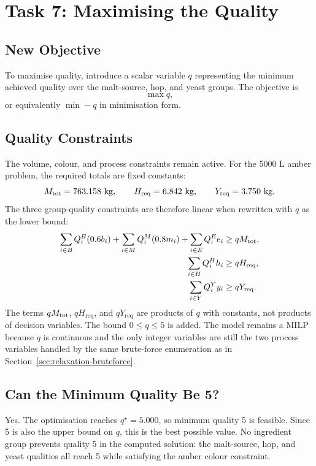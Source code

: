 \section{Task 7: Maximising the Quality}
\label{sec:task7}

\subsection{New Objective}
\label{sec:task7-objective}
To maximise quality, introduce a scalar variable $q$ representing the minimum achieved quality over the malt-source, hop, and yeast groups. The objective is
\begin{equation}
  \max q,
  \label{eq:max-quality-objective}
\end{equation}
or equivalently $\min -q$ in minimisation form.

\subsection{Quality Constraints}
\label{sec:task7-constraints}
The volume, colour, and process constraints remain active. For the 5000 L amber problem, the required totals are fixed constants:
\begin{equation}
  M_{\mathrm{tot}} = 763.158~\mathrm{kg},\qquad
  H_{\mathrm{req}} = 6.842~\mathrm{kg},\qquad
  Y_{\mathrm{req}} = 3.750~\mathrm{kg}.
\end{equation}
The three group-quality constraints are therefore linear when rewritten with $q$ as the lower bound:
\begin{align}
  \sum_{i \in B} Q^B_i(0.6b_i)
  +\sum_{i \in M} Q^M_i(0.8m_i)
  +\sum_{i \in E} Q^E_i e_i
  &\geq qM_{\mathrm{tot}}, \label{eq:q-source}\\
  \sum_{i \in H} Q^H_i h_i
  &\geq qH_{\mathrm{req}}, \label{eq:q-hop}\\
  \sum_{i \in Y} Q^Y_i y_i
  &\geq qY_{\mathrm{req}}. \label{eq:q-yeast}
\end{align}
The terms $qM_{\mathrm{tot}}$, $qH_{\mathrm{req}}$, and $qY_{\mathrm{req}}$ are products of $q$ with constants, not products of decision variables. The bound $0\leq q\leq5$ is added. The model remains a MILP because $q$ is continuous and the only integer variables are still the two process variables handled by the same brute-force enumeration as in Section~\ref{sec:relaxation-bruteforce}.

\subsection{Can the Minimum Quality Be 5?}
\label{sec:task7-quality5}
Yes. The optimisation reaches $q^\star=5.000$, so minimum quality 5 is feasible. Since 5 is also the upper bound on $q$, this is the best possible value. No ingredient group prevents quality 5 in the computed solution: the malt-source, hop, and yeast qualities all reach 5 while satisfying the amber colour constraint.

